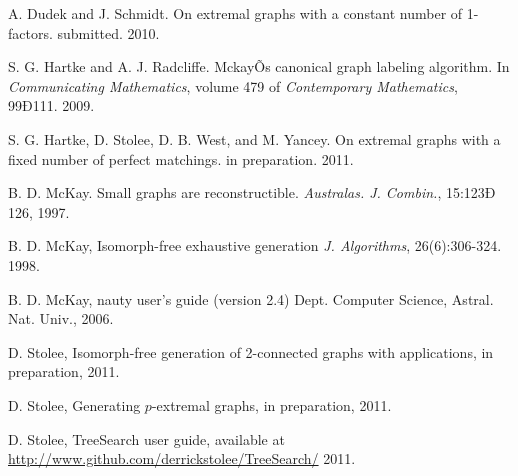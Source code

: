 \documentclass[11pt]{article}
\begin{document}
\begin{thebibliography}{9}
	 A. Dudek and J. Schmidt.
		On extremal graphs with a constant number of 1-factors.
		submitted. 2010.

	 S. G. Hartke and A. J. Radcliffe. 
		MckayÕs canonical graph labeling algorithm. 
		In {\it Communicating Mathematics}, 
		volume 479 of {\it Contemporary Mathematics}, 99Ð111. 2009.
		
	 S. G. Hartke, D. Stolee, D. B. West, and M. Yancey.
		On extremal graphs with a fixed number of perfect matchings.
		in preparation. 2011.

	 B. D. McKay. Small graphs are reconstructible. 
		{\it Australas. J. Combin.}, 15:123Ð 126, 1997.

	 B. D. McKay, 
		Isomorph-free exhaustive generation
		{\it J. Algorithms}, 26(6):306-324. 1998.
		
	 B. D. McKay,
		nauty user's guide (version 2.4)
		Dept. Computer Science, Astral. Nat. Univ., 2006.
	
	 D. Stolee, 
		Isomorph-free generation of 2-connected graphs with applications,
		in preparation, 2011.
		
	 D. Stolee,
		Generating $p$-extremal graphs,
		in preparation, 2011.
		
	 D. Stolee,
		TreeSearch user guide,
		available at 
		\href{http://www.github.com/derrickstolee/TreeSearch/}{http://www.github.com/derrickstolee/TreeSearch/}
		2011.
\end{thebibliography}
\end{document}
